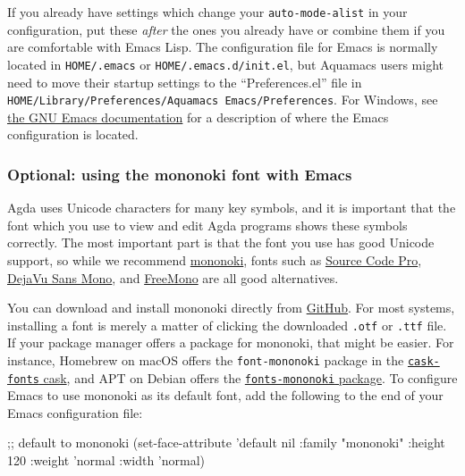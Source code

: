 If you already have settings which change your \texttt{auto-mode-alist}
in your configuration, put these \emph{after} the ones you already have
or combine them if you are comfortable with Emacs Lisp. The
configuration file for Emacs is normally located in \texttt{HOME/.emacs}
or \texttt{HOME/.emacs.d/init.el}, but Aquamacs users might need to move
their startup settings to the ``Preferences.el'' file in
\texttt{HOME/Library/Preferences/Aquamacs\ Emacs/Preferences}. For
Windows, see
\href{https://www.gnu.org/software/emacs/manual/html_node/efaq-w32/Location-of-init-file.html}{the
GNU Emacs documentation} for a description of where the Emacs
configuration is located.

\hypertarget{optional-using-the-mononoki-font-with-emacs}{%
\subsubsection{Optional: using the mononoki font with
Emacs}\label{optional-using-the-mononoki-font-with-emacs}}

Agda uses Unicode characters for many key symbols, and it is important
that the font which you use to view and edit Agda programs shows these
symbols correctly. The most important part is that the font you use has
good Unicode support, so while we recommend
\href{https://madmalik.github.io/mononoki/}{mononoki}, fonts such as
\href{https://github.com/adobe-fonts/source-code-pro}{Source Code Pro},
\href{https://dejavu-fonts.github.io/}{DejaVu Sans Mono}, and
\href{https://www.gnu.org/software/freefont/}{FreeMono} are all good
alternatives.

You can download and install mononoki directly from
\href{https://github.com/madmalik/mononoki}{GitHub}. For most systems,
installing a font is merely a matter of clicking the downloaded
\texttt{.otf} or \texttt{.ttf} file. If your package manager offers a
package for mononoki, that might be easier. For instance, Homebrew on
macOS offers the \texttt{font-mononoki} package in the
\href{https://github.com/Homebrew/homebrew-cask-fonts}{\texttt{cask-fonts}
cask}, and APT on Debian offers the
\href{https://packages.debian.org/sid/fonts/fonts-mononoki}{\texttt{fonts-mononoki}
package}. To configure Emacs to use mononoki as its default font, add
the following to the end of your Emacs configuration file:

\begin{myDisplay}
;; default to mononoki
(set-face-attribute 'default nil
                    :family "mononoki"
                    :height 120
                    :weight 'normal
                    :width  'normal)
\end{myDisplay}

